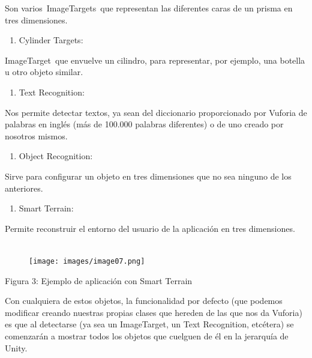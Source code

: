 Son varios~ImageTargets~que representan las diferentes caras de un
prisma en tres dimensiones.

\begin{enumerate}
\def\labelenumi{\arabic{enumi}.}
\setcounter{enumi}{3}
\itemsep1pt\parskip0pt
\item
  Cylinder Targets:~
\end{enumerate}

ImageTarget~que envuelve un cilindro, para representar, por ejemplo, una
botella u otro objeto similar.

\begin{enumerate}
\def\labelenumi{\arabic{enumi}.}
\setcounter{enumi}{4}
\itemsep1pt\parskip0pt
\item
  Text Recognition:
\end{enumerate}

Nos permite detectar textos, ya sean del diccionario proporcionado por
Vuforia de palabras en inglés (más de 100.000 palabras diferentes) o de
uno creado por nosotros mismos.

\begin{enumerate}
\def\labelenumi{\arabic{enumi}.}
\setcounter{enumi}{5}
\itemsep1pt\parskip0pt
\item
  Object Recognition:
\end{enumerate}

Sirve para configurar un objeto en tres dimensiones que no sea ninguno
de los anteriores.

\begin{enumerate}
\def\labelenumi{\arabic{enumi}.}
\setcounter{enumi}{6}
\itemsep1pt\parskip0pt
\item
  Smart Terrain:
\end{enumerate}

Permite reconstruir el entorno del usuario de la aplicación en tres
dimensiones. ~~~~~~~~~~~~~~~~~ ~~~~~~~~

\begin{figure}[htbp]
\centering
\texttt{[image: images/image07.png]}
\end{figure}

Figura 3: Ejemplo de aplicación con Smart Terrain

Con cualquiera de estos objetos, la funcionalidad por defecto (que
podemos modificar creando nuestras propias clases que hereden de las que
nos da Vuforia) es que al detectarse (ya sea un ImageTarget, un Text
Recognition, etcétera) se comenzarán a mostrar todos los objetos que
cuelguen de él en la jerarquía de Unity.


